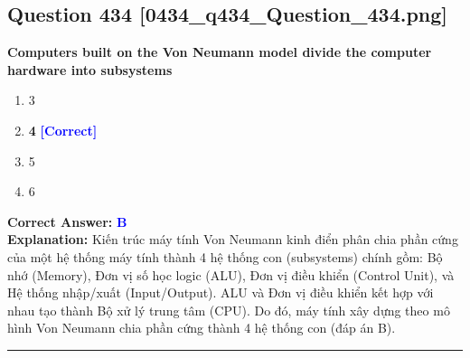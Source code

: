 \documentclass[11pt,a4paper]{article}
\begin{document}
\begin{minipage}{\textwidth}
\subsection*{Question 434 \quad \footnotesize{[0434\_q434\_Question\_434.png]}}
\noindent \textbf{Computers built on the Von Neumann model divide the computer hardware into subsystems}

\begin{enumerate}[label=\Alph*.]
    \item 3
    \item \textbf{4} \hfill \textcolor{blue}{\textbf{[Correct]}}
    \item 5
    \item 6
\end{enumerate}

\noindent \textbf{Correct Answer:} \textcolor{blue}{\textbf{B}} \\[2pt]
\noindent \textbf{Explanation:} Kiến trúc máy tính Von Neumann kinh điển phân chia phần cứng của một hệ thống máy tính thành 4 hệ thống con (subsystems) chính gồm: Bộ nhớ (Memory), Đơn vị số học logic (ALU), Đơn vị điều khiển (Control Unit), và Hệ thống nhập/xuất (Input/Output). ALU và Đơn vị điều khiển kết hợp với nhau tạo thành Bộ xử lý trung tâm (CPU). Do đó, máy tính xây dựng theo mô hình Von Neumann chia phần cứng thành 4 hệ thống con (đáp án B).

\par\vspace{0.3cm}
\hrule
\vspace{0.3cm}
\end{minipage}
\end{document}
